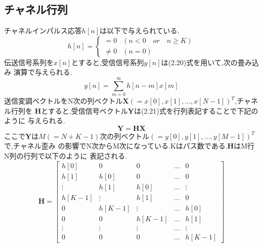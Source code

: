 \subsection{チャネル行列}
チャネルインパルス応答$h[n]$は以下で与えられている.
\begin{equation}
    h[n] = \left\{
        \begin{array}{ll}
            = 0 & (n<0 \quad or \quad n \geq K) \\
            \neq 0 & (n=0)
        \end{array}
    \right.
\end{equation}
伝送信号系列を$x[n]$とすると,受信信号系列$y[n]$は(2.20)式を用いて,次の畳み込み
演算で与えられる.
\begin{equation}
    y[n] = \sum_{m=0}^\infty h[n-m]x[m]
\end{equation}
送信変調ベクトルをN次の列ベクトル$\bm{X}(=x[0],x[1],\ldots,x[N-1])^T$,チャネル行列を
$\bm{H}$とすると,受信信号ベクトル$\bm{Y}$は(2.21)式を行列表記することで下記のように
与えられる.
\begin{equation}
    \bm{Y} = \bm{HX}
\end{equation}
ここで$\bm{Y}$は$M(=N+K-1)$次の列ベクトル$(=y[0],y[1],\ldots,y[M-1])^T$で,チャネル歪み
の影響でN次からM次になっている.Kはパス数である.$\bm{H}$はM行N列の行列で以下のように
表記される.
\begin{equation}
    \bm{H} = \left[
        \begin{array}{ccccc}
            h[0] & 0 & 0 & \ldots & 0 \\
            h[1] & h[0] & 0 & \ldots & 0 \\
            \vdots & h[1] & h[0] & \ldots & \vdots \\
            h[K-1] & \vdots & h[1] & \ldots & 0 \\
            0 & h[K-1] & \vdots & \ldots & h[0] \\
            0 & 0 & h[K-1] & \ldots & h[1] \\
            \vdots & \vdots & \vdots & \ldots & \vdots \\
            0 & 0 & 0 & \ldots & h[K-1]
        \end{array}
    \right]
\end{equation}


